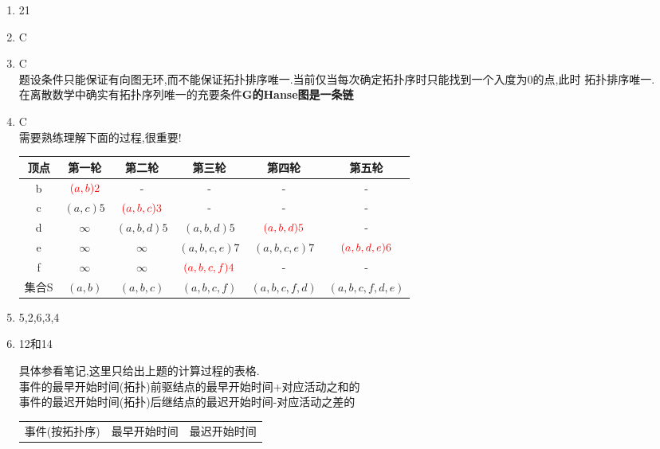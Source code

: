 \documentclass[12pt, a4paper, oneside, UTF8]{ctexbook}
\begin{document}
\begin{enumerate}
\begin{center}
\begin{tikzpicture}[node distance=1.8cm,
                every node/.style={circle,draw,minimum size=6mm}]
        \end{tikzpicture}
    \end{center}
    \item 21
    \item C
    \item C \\
    题设条件只能保证有向图无环,而不能保证拓扑排序唯一.当前仅当每次确定拓扑序时只能找到一个入度为0的点,此时
    拓扑排序唯一.  \\
    在离散数学中确实有拓扑序列唯一的充要条件\textbf{G的Hanse图是一条链}
    \item C \\
    需要熟练理解下面的过程,很重要! 
    \begin{center}
    \begin{tabular}{c|c|c|c|c|c}
        \hline
        顶点 & 第一轮 & 第二轮 & 第三轮 & 第四轮 & 第五轮 \\
        \hline 
        b & $\color{red}(a,b)2$ & - & - & - & - \\
        \hline
        c & $(a,c)5$ & $\color{red}(a,b,c)3$ & - & - & - \\
        \hline 
        d & $\infty$ & $(a,b,d)5$ & $(a,b,d) 5$ & $\color{red} (a,b,d) 5$ & - \\
        \hline
        e & $\infty$ & $\infty$ & $(a,b,c,e) 7$ & $(a,b,c,e)7$ & $\color{red} (a,b,d,e)6$ \\
        \hline
        f & $\infty$ & $\infty$ & $\color{red} (a,b,c,f)4$ & - & - \\
        \hline 
        集合S & $(a,b)$ & $(a,b,c)$ & $(a,b,c,f)$ & $(a,b,c,f,d)$ & $(a,b,c,f,d,e)$ \\
        \hline
    \end{tabular}
    \end{center}
    \item 5,2,6,3,4 
    \item 12和14 
    \begin{definition}[AOE网络的计算过程] 
        具体参看笔记,这里只给出上题的计算过程的表格.\\
        事件的最早开始时间(拓扑)前驱结点的最早开始时间+对应活动之和的 \\
        事件的最迟开始时间(拓扑)后继结点的最迟开始时间-对应活动之差的 
        \begin{center}
        \begin{tabular}{p{3.5cm}|p{4.5cm}|p{4.5cm}}
            \hline
            事件(按拓扑序) & 最早开始时间 & 最迟开始时间  \\ 

\end{tabular}
\end{center}
\end{definition}
\end{enumerate}
\end{document}
